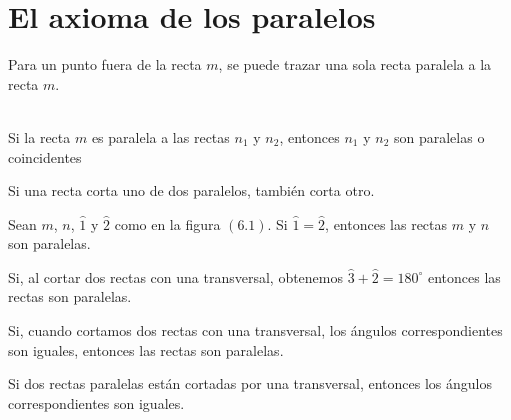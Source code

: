 \chapter{El axioma de los paralelos}

\begin{axioma}
    Para un punto fuera de la recta $m$, se puede trazar una sola recta paralela a la recta $m$.\\\\    
\end{axioma}

	    \begin{proposicion}
		Si la recta $m$ es paralela a las rectas $n_1$ y $n_2$, entonces $n_1$ y $n_2$ son paralelas o coincidentes\\
	    \end{proposicion}

	\begin{cor}
	    Si una recta corta uno de dos paralelos, también corta otro.\\
	\end{cor}

	    \begin{proposicion}
		Sean $m$, $n$, $\widehat{1}$ y $\widehat{2}$ como en la figura $(6.1)$. Si $\widehat{1} = \widehat{2}$, entonces las rectas $m$ y $n$ son paralelas.\\
	    \end{proposicion}

	    \begin{proposicion}
		Si, al cortar dos rectas con una transversal, obtenemos $\widehat{3} + \widehat{2} = 180^{\circ}$ entonces las rectas son paralelas.\\
	    \end{proposicion}

	    \begin{proposicion}
		Si, cuando cortamos dos rectas con una transversal, los ángulos correspondientes son iguales, entonces las rectas son paralelas.\\
	    \end{proposicion}

	    \begin{proposicion}
		Si dos rectas paralelas están cortadas por una transversal, entonces los ángulos correspondientes son iguales.\\
	    \end{proposicion}

